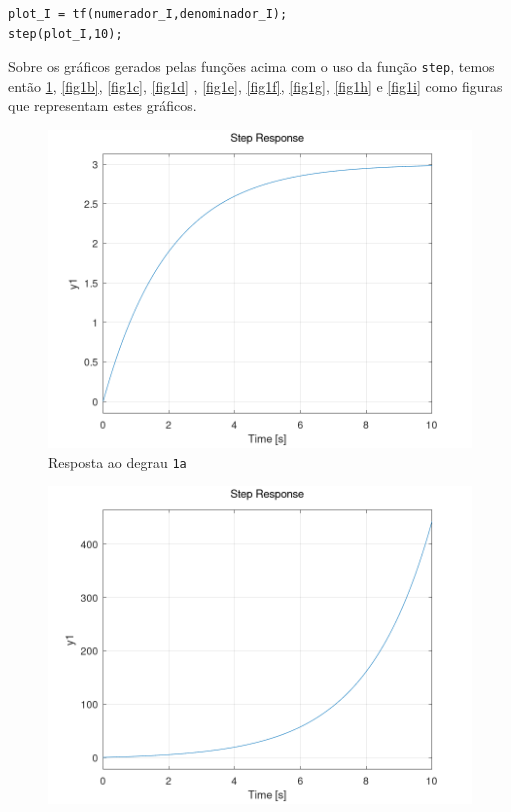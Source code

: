 \documentclass[a4paper,12pt]{article}
\begin{document}
\begin{enumerate}
\begin{lstlisting}
plot_I = tf(numerador_I,denominador_I);
step(plot_I,10);
        \end{lstlisting}
        Sobre os gráficos gerados pelas funções acima com o uso da função \texttt{step}, temos então \ref{fig1a}, \ref{fig1b}, \ref{fig1c}, \ref{fig1d}
        , \ref{fig1e}, \ref{fig1f}, \ref{fig1g}, \ref{fig1h} e \ref{fig1i} como figuras que representam estes gráficos.
        \begin{figure}[htbp]
            \centering
            \includegraphics[scale=0.4]{../fig/fig1a.png}
            \caption{Resposta ao degrau \texttt{1a}}
            \label{fig1a}
        \end{figure}
        \begin{figure}[htbp]
            \centering
            \includegraphics[scale=0.4]{../fig/fig1b.png}

\end{figure}
\end{enumerate}
\end{document}
